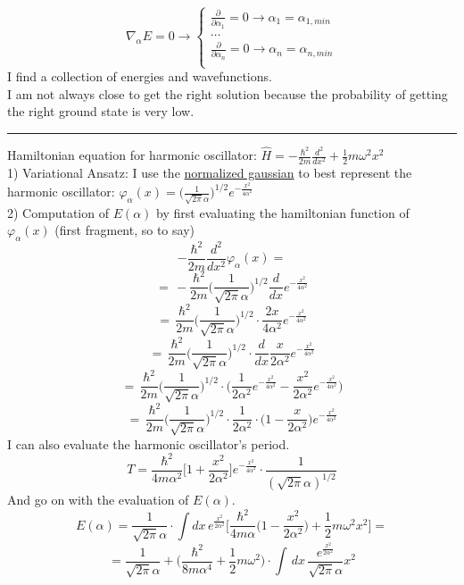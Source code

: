 \[
\nabla_{\alpha}E=0 \rightarrow
\begin{cases}
\frac{\partial}{\partial \alpha_1}=0 \rightarrow \alpha_1=\alpha_{1, min}\\
\dots\\
\frac{\partial}{\partial \alpha_n}=0 \rightarrow \alpha_n= \alpha_{n, min}\\
\end{cases}
\]
I find a collection of energies and wavefunctions.\\
I am not always close to get the right solution because the probability of getting the right ground state is very low.\\
\newline
\noindent\rule{4cm}{0.1pt}
\newline
Hamiltonian equation for harmonic oscillator: $\hat{H}=-\frac{\hbar^2}{2m}\frac{d^2}{dx^2}+\frac{1}{2}m\omega^2x^2$\\
1) Variational Ansatz: I use the \underline{normalized gaussian} to best represent the harmonic oscillator: $\varphi_{\alpha}(x)=\bigg(\frac{1}{\sqrt{2\pi}\alpha}\bigg)^{1/2}e^{-{\frac{x^2}{4\alpha^2}}}$\\
2) Computation of $E(\alpha)$ by first evaluating the hamiltonian function of $\varphi_{\alpha}(x)$ (first fragment, so to say)
\[
-\frac{\hbar^2}{2m}\frac{d^2}{dx^2}\varphi_{\alpha}(x)=\]
\[=\,-\frac{\hbar^2}{2m}\bigg(\frac{1}{\sqrt{2\pi}\alpha}\bigg)^{1/2}\frac{d}{dx}e^{-{\frac{x^2}{4\alpha^2}}}\]
\[
=\,\frac{\hbar^2}{2m}\bigg(\frac{1}{\sqrt{2\pi}\alpha}\bigg)^{1/2}\cdot\frac{2x}{4\alpha^2}e^{-{\frac{x^2}{4\alpha^2}}}
\]
\[
=\,\frac{\hbar^2}{2m}\bigg(\frac{1}{\sqrt{2\pi}\alpha}\bigg)^{1/2}\cdot\frac{d}{dx}\frac{x}{2\alpha^2}e^{-{\frac{x^2}{4\alpha^2}}}
\]
\[
=\,\frac{\hbar^2}{2m}\bigg(\frac{1}{\sqrt{2\pi}\alpha}\bigg)^{1/2}\cdot\bigg(\frac{1}{2\alpha^2}e^{-{\frac{x^2}{4\alpha^2}}}-\frac{x^2}{2\alpha^2}e^{-\frac{x^2}{4\alpha^2}}\bigg)
\]
\[
=\,\frac{\hbar^2}{2m}\bigg(\frac{1}{\sqrt{2\pi}\alpha}\bigg)^{1/2}\cdot\frac{1}{2\alpha^2}\cdot\bigg(1-\frac{x}{2\alpha^2}\bigg)e^{-{\frac{x^2}{4\alpha^2}}}
\]
I can also evaluate the harmonic oscillator's period.
\[
T=\frac{\hbar^2}{4m\alpha^2}\bigg[1+\frac{x^2}{2\alpha^2}\bigg]e^{-{\frac{x^2}{4\alpha^2}}}\cdot\frac{1}{(\sqrt{2\pi}\alpha)^{1/2}}
\]
And go on with the evaluation of $E(\alpha)$.
\[
E(\alpha)=\frac{1}{\sqrt{2\pi}\alpha}\cdot \int dx\, e^{\frac{x^2}{2\alpha^2}}\bigg[\frac{\hbar^2}{4m\alpha}\bigg(1-\frac{x^2}{2\alpha^2}\bigg)+\frac{1}{2}m\omega^2x^2\bigg]=
\]
\[
=\frac{1}{\sqrt{2\pi}\alpha}+\bigg(\frac{\hbar^2}{8m\alpha^4}+\frac{1}{2}m\omega^2\bigg)\cdot \int\,dx\,\frac{e^{\frac{x^2}{2\alpha^2}}}{\sqrt{2\pi}\alpha}x^2
\]
